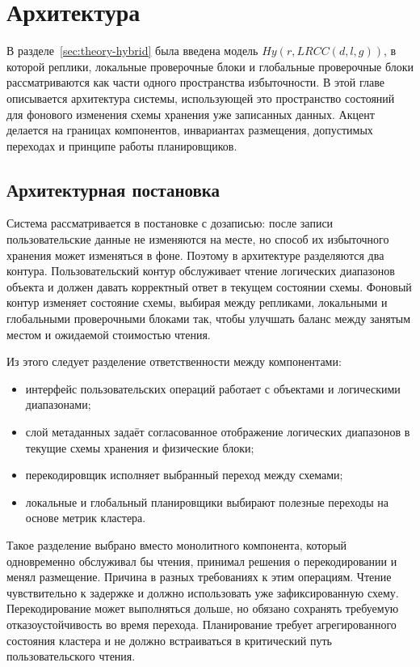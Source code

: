 \section{Архитектура}


В разделе~\ref{sec:theory-hybrid} была введена модель
\(Hy(r, LRCC(d,l,g))\), в которой реплики, локальные проверочные блоки и
глобальные проверочные блоки рассматриваются как части одного пространства
избыточности. В этой главе описывается архитектура системы, использующей это
пространство состояний для фонового изменения схемы хранения уже записанных
данных. Акцент делается на границах компонентов, инвариантах размещения,
допустимых переходах и принципе работы планировщиков.

\subsection{Архитектурная постановка}

Система рассматривается в постановке с дозаписью: после записи пользовательские
данные не изменяются на месте, но способ их избыточного хранения может
изменяться в фоне. Поэтому в архитектуре разделяются два контура.
Пользовательский контур обслуживает чтение логических диапазонов объекта и
должен давать корректный ответ в текущем состоянии схемы. Фоновый контур
изменяет состояние схемы, выбирая между репликами, локальными и глобальными
проверочными блоками так, чтобы улучшать баланс между занятым местом и
ожидаемой стоимостью чтения.

Из этого следует разделение ответственности между компонентами:
\begin{itemize}
    \item интерфейс пользовательских операций работает с объектами и
    логическими диапазонами;
    \item слой метаданных задаёт согласованное отображение логических диапазонов
    в текущие схемы хранения и физические блоки;
    \item перекодировщик исполняет выбранный переход между схемами;
    \item локальные и глобальный планировщики выбирают полезные переходы на
    основе метрик кластера.
\end{itemize}

Такое разделение выбрано вместо монолитного компонента, который одновременно
обслуживал бы чтения, принимал решения о перекодировании и менял размещение.
Причина в разных требованиях к этим операциям. Чтение чувствительно к задержке
и должно использовать уже зафиксированную схему. Перекодирование может
выполняться дольше, но обязано сохранять требуемую отказоустойчивость во время
перехода. Планирование требует агрегированного состояния кластера и не должно
встраиваться в критический путь пользовательского чтения.

